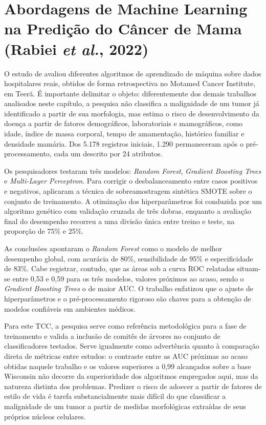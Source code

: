\documentclass[
    12pt
    ,oneside
    ,a4paper
    ,chapter=TITLE
    ,section=TITLE
    ,sumario=abnt-6027-2012
    ,english,brazil]{abntex2} %
\begin{document}
\section{Abordagens de Machine Learning na Predição do Câncer de Mama (Rabiei \textit{et al.}, 2022)}

O estudo de  avaliou diferentes algoritmos de aprendizado de máquina sobre dados hospitalares reais, obtidos de forma retrospectiva no Motamed Cancer Institute, em Teerã. É importante delimitar o objeto: diferentemente dos demais trabalhos analisados neste capítulo, a pesquisa não classifica a malignidade de um tumor já identificado a partir de sua morfologia, mas estima o risco de desenvolvimento da doença a partir de fatores demográficos, laboratoriais e mamográficos, como idade, índice de massa corporal, tempo de amamentação, histórico familiar e densidade mamária. Dos 5.178 registros iniciais, 1.290 permaneceram após o pré-processamento, cada um descrito por 24 atributos.

Os pesquisadores testaram três modelos: \textit{Random Forest}, \textit{Gradient Boosting Trees} e \textit{Multi-Layer Perceptron}. Para corrigir o desbalanceamento entre casos positivos e negativos, aplicaram a técnica de sobreamostragem sintética SMOTE sobre o conjunto de treinamento. A otimização dos hiperparâmetros foi conduzida por um algoritmo genético com validação cruzada de três dobras, enquanto a avaliação final do desempenho recorreu a uma divisão única entre treino e teste, na proporção de 75\% e 25\%.

As conclusões apontaram o \textit{Random Forest} como o modelo de melhor desempenho global, com acurácia de 80\%, sensibilidade de 95\% e especificidade de 83\%. Cabe registrar, contudo, que as áreas sob a curva ROC relatadas situam-se entre 0,53 e 0,59 para os três modelos, valores próximos ao acaso, sendo o \textit{Gradient Boosting Trees} o de maior AUC. O trabalho enfatizou que o ajuste de hiperparâmetros e o pré-processamento rigoroso são chaves para a obtenção de modelos confiáveis em ambientes médicos.

Para este TCC, a pesquisa serve como referência metodológica para a fase de treinamento e valida a inclusão de comitês de árvores no conjunto de classificadores testados. Serve igualmente como advertência quanto à comparação direta de métricas entre estudos: o contraste entre as AUC próximas ao acaso obtidas naquele trabalho e os valores superiores a 0,99 alcançados sobre a base Wisconsin não decorre da superioridade dos algoritmos empregados aqui, mas da natureza distinta dos problemas. Predizer o risco de adoecer a partir de fatores de estilo de vida é tarefa substancialmente mais difícil do que classificar a malignidade de um tumor a partir de medidas morfológicas extraídas de seus próprios núcleos celulares.
\end{document}
